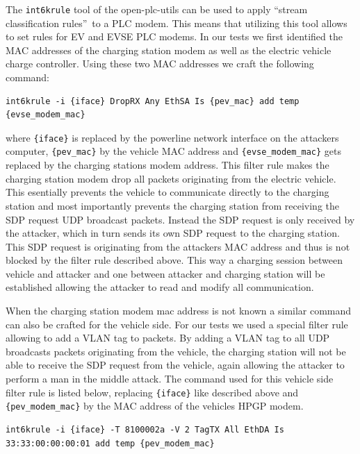 \documentclass[sigconf]{acmart}
\begin{document}
The \texttt{int6krule} tool of the open-plc-utils \citep{qcaopen-plc-utils} can be used to apply \textquotedblleft stream classification rules\textquotedblright\ to a PLC modem. This means that utilizing this tool allows to set rules for EV and EVSE PLC modems.
In our tests we first identified the MAC addresses of the charging station modem as well as the electric vehicle charge controller.
Using these two MAC addresses we craft the following command:
\begin{lstlisting}
int6krule -i {iface} DropRX Any EthSA Is {pev_mac} add temp {evse_modem_mac}
\end{lstlisting}
where \verb'{iface}' is replaced by the powerline network interface on the attackers computer, \verb'{pev_mac}' by the vehicle MAC address and \verb'{evse_modem_mac}' gets replaced by the charging stations modem address.
This filter rule makes the charging station modem drop all packets originating from the electric vehicle.
This esentially prevents the vehicle to communicate directly to the charging station and most importantly prevents the charging station from receiving the SDP request UDP broadcast packets.
Instead the SDP request is only received by the attacker, which in turn sends its own SDP request to the charging station.
This SDP request is originating from the attackers MAC address and thus is not blocked by the filter rule described above.
This way a charging session between vehicle and attacker and one between attacker and charging station will be established allowing the attacker to read and modify all communication.

When the charging station modem mac address is not known a similar command can also be crafted for the vehicle side.
For our tests we used a special filter rule allowing to add a VLAN tag to packets.
By adding a VLAN tag to all UDP broadcasts packets originating from the vehicle, the charging station will not be able to receive the SDP request from the vehicle, again allowing the attacker to perform a man in the middle attack.
The command used for this vehicle side filter rule is listed below, replacing \verb'{iface}' like described above and \verb'{pev_modem_mac}' by the MAC address of the vehicles HPGP modem.
\begin{lstlisting}
int6krule -i {iface} -T 8100002a -V 2 TagTX All EthDA Is 33:33:00:00:00:01 add temp {pev_modem_mac}
\end{lstlisting}
\end{document}
